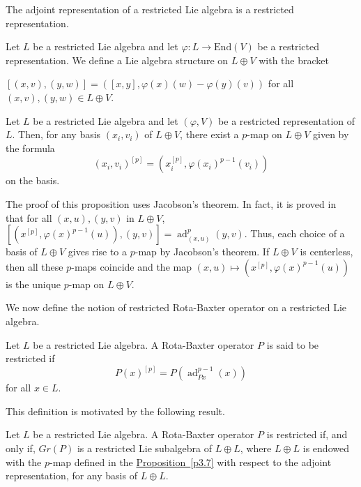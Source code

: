 \documentclass[11pt, twoside]{article}
\DeclareMathOperator{\ad}{ad}
\begin{document}
\begin{ex}
    The adjoint representation of a restricted Lie algebra is a restricted representation.
\end{ex}

Let $L$ be a restricted Lie algebra and let $\varphi:L\to \mathrm{End}(V)$ be a restricted representation. We define a Lie algebra structure on $L\oplus V $ with the bracket \begin{center}
    $[(x,v),(y,w)]= ([x,y],\varphi(x)(w) - \varphi(y)(v)) $ for all $(x,v),(y,w)\in L\oplus V $.
\end{center}

\begin{prop}\label{p3.7}
    Let $L$ be a restricted Lie algebra and let $(\varphi,V)$ be a restricted representation of $L$. Then, for any basis $(x_i,v_i)$ of $L\oplus V$, there exist a $p$-map on $L\oplus V$ given by the formula $$(x_i,v_i)^{[p]}= (x_i^{[p]}, \varphi(x_i)^{p-1}(v_i)) $$ on the basis. 
\end{prop}

\begin{rmq}
    The proof of this proposition uses Jacobson's theorem. In fact, it is proved in \cite{BEMS25} that for all $(x,u),(y,v) $ in $L\oplus V$, $[(x^{[p]},\varphi(x)^{p-1}(u)),(y,v)]= \ad_{(x,u)}^{p}(y,v) $. Thus, each choice of a basis of $L\oplus V $ gives rise to a $p$-map by Jacobson's theorem. If $L\oplus V$ is centerless, then all these $p$-maps coincide and the map $(x,u)\mapsto (x^{[p]},\varphi(x)^{p-1}(u)) $ is the unique $p$-map on $L\oplus V $.
\end{rmq}

We now define the notion of restricted Rota-Baxter operator on a restricted Lie algebra.

\begin{defi}\label{d3.6}
    Let $L$ be a restricted Lie algebra. A Rota-Baxter operator $P$ is said to be restricted if $$P(x)^{[p]}=P(\ad_{Px}^{p-1}(x)) $$ for all $x\in L $.
\end{defi}

This definition is motivated by the following result.

\begin{prop}\label{p3.10}
    Let $L$ be a restricted Lie algebra. A Rota-Baxter operator $P$ is restricted if, and only if, $Gr(P) $ is a restricted Lie subalgebra of $L\oplus L$, where $L\oplus L $ is endowed with the $p$-map defined in the \hyperref[p3.7]{Proposition~\ref*{p3.7}} with respect to the adjoint representation, for any basis of $L\oplus L $. 
\end{prop}
\end{document}
